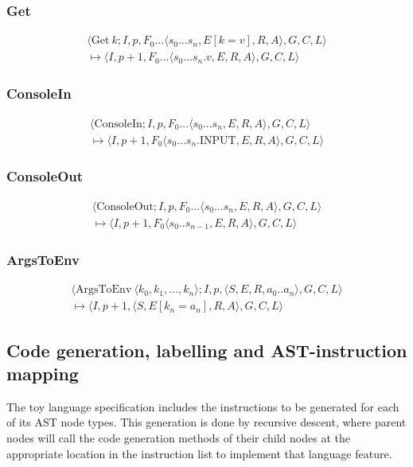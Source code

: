 \subsubsection{Get}
\begin{multline*}
\langle \text{Get}\ k; I, p, F_0...\langle s_0...s_n, E[k=v], R, A\rangle , G, C, L\rangle  \\ \mapsto \langle I, p+1, F_0...\langle s_0...s_n.v, E, R, A\rangle , G, C, L\rangle 
\end{multline*}
\subsubsection{ConsoleIn}
\begin{multline*}
\langle \text{ConsoleIn}; I, p, F_0...\langle s_0...s_n, E, R, A\rangle , G, C, L\rangle  \\ \mapsto \langle I, p+1, F_0\langle s_0...s_n.\text{INPUT}, E, R, A\rangle , G, C, L\rangle 
\end{multline*}
\subsubsection{ConsoleOut}
\begin{multline*}
\langle \text{ConsoleOut}; I, p, F_0...\langle s_0...s_n, E, R, A\rangle , G, C, L\rangle  \\ \mapsto \langle I, p+1, F_0\langle s_0..s_{n-1}, E, R, A\rangle , G, C, L\rangle 
\end{multline*}
\subsubsection{ArgsToEnv}
\begin{multline*}
\langle \text{ArgsToEnv}\ \langle k_0, k_1, ..., k_n\rangle ; I, p, \langle S, E, R, a_0..a_n \rangle, G, C, L \rangle \\ \mapsto \langle I, p+1, \langle S, E[k_n = a_n], R, A\rangle , G, C, L \rangle
\end{multline*}
\subsection{Code generation, labelling and AST-instruction mapping}

The toy language specification includes the instructions to be generated for each of its AST node types. This generation is done by recursive descent, where parent nodes will call the code generation methods of their child nodes at the appropriate location in the instruction list to implement that language feature.

